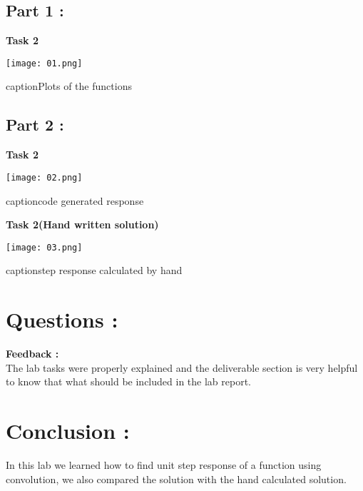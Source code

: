 \documentclass[11pt]{article}
\begin{document}
\subsection{Part 1 :}
{\bf Task 2}

\centerline{\texttt{[image: 01.png]}}
\centerline{caption{Plots of the functions}}
\label{fig:my_label}
\subsection{Part 2 :}
{\bf Task 2}



\centerline{\texttt{[image: 02.png]}}
\centerline{caption{code generated response}}
\label{fig:my_label}

{\bf Task 2(Hand written solution)}

\centerline{\texttt{[image: 03.png]}}
\centerline{caption{step response calculated by hand}}
\label{fig:my_label} 





\section{Questions : }

{\bf Feedback :}
\\The lab tasks were properly explained and the deliverable section is very helpful to know that what should be included in the lab report.


\section{Conclusion : }
In this lab we learned how to find unit step response of a function using convolution, we also compared the solution with the hand calculated solution.
\end{document}
